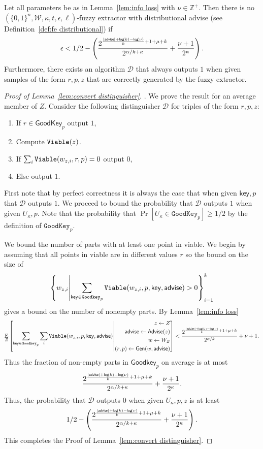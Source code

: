 \begin{lemma}
\label{lem:convert distinguisher}
Let all parameters be as in Lemma~\ref{lem:info loss} with $\nu \in\mathbb{Z}^+$.  Then there is no $(\{0,1\}^n, \mathcal{W}, \kappa, t, \epsilon, \ell)$-fuzzy extractor with distributional advise (see Definition~\ref{def:fe distributional}) if
\[
\epsilon<1/2-\left(\frac{2^{\frac{|{\mathsf{advise}}|+\mathsf{log}\!\left(k\right)-\mathsf{log}\!\left(\nu\right)}{k}+1+\mu+k}}{{2^{\alpha/k+\kappa}}}+\frac{\nu+1}{2^{\kappa}}\right).
\]
Furthermore, there exists an algorithm $\mathcal{D}$ that always outputs $1$ when given samples of the form $r, p, z$ that are correctly generated by the fuzzy extractor.
\end{lemma}
\begin{proof}[Proof of Lemma~\ref{lem:convert distinguisher}].
We prove the result for an average member of $Z$.  Consider the following distinguisher $\mathcal{D}$ for triples of the form $r, p, z$:
\begin{enumerate}
\item If $r \in \mathsf{GoodKey}_p$ output $1$,
\item Compute $\mathtt{Viable}(z)$.
\item If $\sum_{i} \mathtt{Viable}(w_{z, i}, r, p) =0 $ output $0$,
\item Else output $1$.
\end{enumerate}
First note that by perfect correctness it is always the case that when given $\mathsf{key}, p$ that $\mathcal{D}$ outputs $1$.  We proceed to bound the probability that $\mathcal{D}$ outputs $1$ when given $U_\kappa, p$.  Note that the probability that $\Pr[U_\kappa \in \mathtt{GoodKey}_p] \ge 1/2$ by the definition of $\mathtt{GoodKey}_p$. 

We bound the number of parts with at least one point in viable.  We begin by assuming that all points in viable are in different  values $r$ so the bound on the size of 
\[
\left\{w_{z, i} \middle|\sum_{\mathsf{key}\in\mathtt{Goodkey}_p} \mathtt{Viable}(w_{z,i}, p, \mathsf{key}, {\mathsf{advise}})>0\right\}_{i=1}^k 
\] 
gives a bound on the number of nonempty parts. By Lemma~\ref{lem:info loss} 
\[
\operatorname*{\mathbb{E}}_{Z} \left[\sum_{\mathsf{key} \in \mathtt{Goodkey}_p}\sum_{i }  \mathtt{Viable}(w_{z,i}, p, \mathsf{key}, {\mathsf{advise}}) \middle| \begin{aligned} z\leftarrow Z\\ {\mathsf{advise}}\leftarrow {\ensuremath{\mathsf{Advise}}}(z)\\w\leftarrow W_Z\\(r, p)\leftarrow {\ensuremath{\mathsf{Gen}}}(w, {\mathsf{advise}})\end{aligned} \right]< \frac{2^{\frac{|{\mathsf{advise}}|+\mathsf{log}\!\left(k\right)-\mathsf{log}\!\left(\nu\right)}{k}+1+\mu+k}}{{2^{\alpha/k}}}+\nu+1.
\]
Thus the fraction of non-empty parts in $\mathsf{Goodkey}_p$ on average is at most 
\[
\frac{2^{\frac{|{\mathsf{advise}}|+\mathsf{log}\!\left(k\right)-\mathsf{log}\!\left(\nu\right)}{k}+1+\mu+k}}{{2^{\alpha/k+\kappa}}}+\frac{\nu+1}{2^\kappa}.
\]
Thus, the probability that $\mathcal{D}$ outputs $0$ when given $U_\kappa, p, z$ is at least 
\[
1/2-\left(\frac{2^{\frac{|{\mathsf{advise}}|+\mathsf{log}\!\left(k\right)-\mathsf{log}\!\left(\nu\right)}{k}+1+\mu+k}}{{2^{\alpha/k+\kappa}}}+\frac{\nu+1}{2^{\kappa}}\right).
\]
\noindent
This completes the Proof of Lemma~\ref{lem:convert distinguisher}.
\end{proof}


